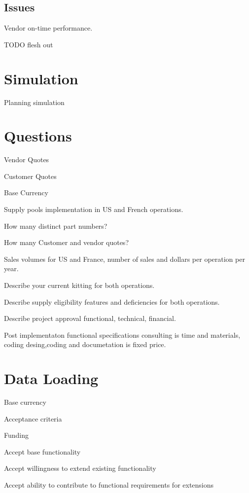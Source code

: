 \documentclass[letterpaper,10pt,english]{sphinxmanual}
\begin{document}
\section{Issues}
\label{\detokenize{LeadTimeByVendor:issues}}
Vendor on-time performance.

TODO flesh out


\chapter{Simulation}
\label{\detokenize{Simulation:simulation}}\label{\detokenize{Simulation::doc}}
Planning simulation


\chapter{Questions}
\label{\detokenize{Questions:questions}}\label{\detokenize{Questions::doc}}
Vendor Quotes

Customer Quotes

Base Currency

Supply pools implementation in US and French operations.

How many distinct part numbers?

How many Customer and vendor quotes?

Sales volumes for US and France, number of sales and dollars per operation per year.

Describe your current kitting for both operations.

Describe supply eligibility features and deficiencies for both operations.

Describe project approval functional, technical, financial.

Post implementaton functional specifications consulting is time and materials, coding desing,coding
and documetation is fixed price.


\chapter{Data Loading}
\label{\detokenize{Dataload:data-loading}}\label{\detokenize{Dataload::doc}}
Base currency

Acceptance criteria

Funding

Accept base functionality

Accept willingness to extend existing functionality

Accept ability to contribute to functional requirements for extensions
\end{document}
